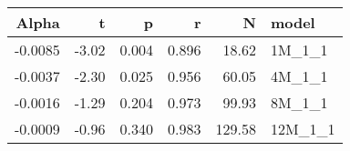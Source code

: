 \begin{table}[ht]
\centering
\begin{tabular}{rrrrrl}
  \hline
Alpha & t & p & r & N & model \\ 
  \hline
-0.0085 & -3.02 & 0.004 & 0.896 & 18.62 & 1M\_1\_1 \\ 
  -0.0037 & -2.30 & 0.025 & 0.956 & 60.05 & 4M\_1\_1 \\ 
  -0.0016 & -1.29 & 0.204 & 0.973 & 99.93 & 8M\_1\_1 \\ 
  -0.0009 & -0.96 & 0.340 & 0.983 & 129.58 & 12M\_1\_1 \\ 
   \hline
\end{tabular}
\end{table}

